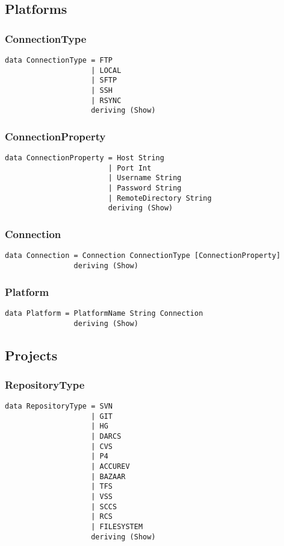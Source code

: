 \documentclass[11pt]{article}
\begin{document}
\subsection{Platforms}
\subsubsection{ConnectionType}
\begin{lstlisting}
data ConnectionType = FTP
                    | LOCAL
                    | SFTP
                    | SSH
                    | RSYNC
                    deriving (Show)
\end{lstlisting}
\subsubsection{ConnectionProperty}
\begin{lstlisting}
data ConnectionProperty = Host String
                        | Port Int
                        | Username String
                        | Password String
                        | RemoteDirectory String
                        deriving (Show)
\end{lstlisting}
\subsubsection{Connection}
\begin{lstlisting}
data Connection = Connection ConnectionType [ConnectionProperty]
                deriving (Show)

\end{lstlisting}
\subsubsection{Platform}
\begin{lstlisting}
data Platform = PlatformName String Connection
                deriving (Show)
\end{lstlisting}

\subsection{Projects}
\subsubsection{RepositoryType}
\begin{lstlisting}
data RepositoryType = SVN
                    | GIT
                    | HG
                    | DARCS
                    | CVS
                    | P4
                    | ACCUREV
                    | BAZAAR
                    | TFS
                    | VSS
                    | SCCS
                    | RCS
                    | FILESYSTEM
                    deriving (Show)
\end{lstlisting}
\end{document}
